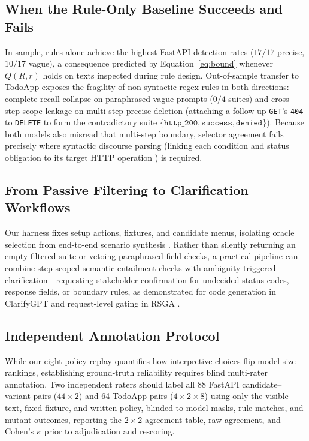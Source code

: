 \documentclass[sigconf,nonacm]{acmart}
\begin{document}
\subsection{When the Rule-Only Baseline Succeeds and Fails}
In-sample, rules alone achieve the highest FastAPI detection rates ($17/17$ precise, $10/17$ vague), a consequence predicted by Equation~\ref{eq:bound} whenever $Q(R,r)$ holds on texts inspected during rule design. Out-of-sample transfer to TodoApp exposes the fragility of non-syntactic regex rules in both directions: complete recall collapse on paraphrased vague prompts ($0/4$ suites) and cross-step scope leakage on multi-step precise deletion (attaching a follow-up \texttt{GET}'s \texttt{404} to \texttt{DELETE} to form the contradictory suite $\{\texttt{http\_200},\texttt{success},\texttt{denied}\}$). Because both models also misread that multi-step boundary, selector agreement fails precisely where syntactic discourse parsing (linking each condition and status obligation to its target HTTP operation \cite{fischbach2023}) is required.

\subsection{From Passive Filtering to Clarification Workflows}
Our harness fixes setup actions, fixtures, and candidate menus, isolating oracle selection from end-to-end scenario synthesis \cite{ferreira2025,kogler2025restifai,shi2026}. Rather than silently returning an empty filtered suite or vetoing paraphrased field checks, a practical pipeline can combine step-scoped semantic entailment checks with ambiguity-triggered clarification---requesting stakeholder confirmation for undecided status codes, response fields, or boundary rules, as demonstrated for code generation in ClarifyGPT \cite{mu2024clarify} and request-level gating in RSGA \cite{madani2026}.

\subsection{Independent Annotation Protocol}
\label{sec:annotation}
While our eight-policy replay quantifies how interpretive choices flip model-size rankings, establishing ground-truth reliability requires blind multi-rater annotation. Two independent raters should label all 88 FastAPI candidate--variant pairs ($44\times2$) and 64 TodoApp pairs ($4\times2\times8$) using only the visible text, fixed fixture, and written policy, blinded to model masks, rule matches, and mutant outcomes, reporting the $2\times2$ agreement table, raw agreement, and Cohen's $\kappa$ \cite{cohen1960} prior to adjudication and rescoring.
\end{document}

